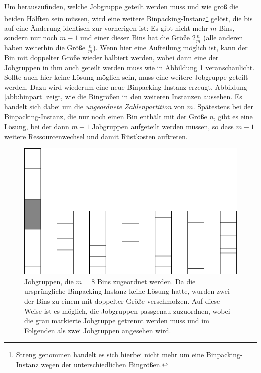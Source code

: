 \documentclass{scrreprt}
\begin{document}
Um herauszufinden, welche Jobgruppe geteilt werden muss und wie groß die beiden Hälften sein müssen,
wird eine weitere Binpacking-Instanz\footnote{Streng genommen handelt es sich hierbei nicht mehr um eine Binpacking-Instanz wegen der unterschiedlichen Bingrößen.} 
gelöst, die bis auf eine Änderung identisch zur vorherigen ist:
Es gibt nicht mehr $m$ Bins, sondern nur noch $m-1$ und einer dieser Bins hat die Größe $2\frac{n}{m}$ (alle anderen haben weiterhin die Größe $\frac{n}{m}$).
Wenn hier eine Aufteilung möglich ist, kann der Bin mit doppelter Größe wieder halbiert werden,
wobei dann eine der Jobgruppen in ihm auch geteilt werden muss wie in Abbildung \ref{abb:2binbsp} veranschaulicht.
Sollte auch hier keine Lösung möglich sein, muss eine weitere Jobgruppe geteilt werden.
Dazu wird wiederum eine neue Binpacking-Instanz erzeugt.
Abbildung \ref{abb:binpart} zeigt, wie die Bingrößen in den weiteren Instanzen aussehen.
Es handelt sich dabei um die \textit{ungeordnete Zahlenpartition} von $m$.
Spätestens bei der Binpacking-Instanz, die nur noch einen Bin enthält mit der Größe $n$, gibt es eine Lösung,
bei der dann $m-1$ Jobgruppen aufgeteilt werden müssen, so dass $m-1$ weitere Ressourcenwechsel und damit Rüstkosten auftreten.
\begin{figure}
    \begin{center}
        \includegraphics[width=.6\textwidth]{graphics/2binbsp.pdf}
    \end{center}
    \caption{
        \label{abb:2binbsp}
        Jobgruppen, die $m=8$ Bins zugeordnet werden.
        Da die ursprüngliche Binpacking-Instanz keine Lösung hatte, wurden zwei der Bins zu einem mit doppelter Größe verschmolzen.
        Auf diese Weise ist es möglich, die Jobgruppen passgenau zuzuordnen, wobei die grau markierte Jobgruppe
        getrennt werden muss und im Folgenden als zwei Jobgruppen angesehen wird.
    }
\end{figure}
\end{document}
